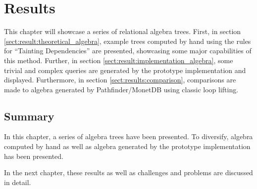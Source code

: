 \chapter{Results}
\label{chapter:results}
This chapter will showcase a series of relational algebra trees. First, in
section \ref{sect:result:theoretical_algebra}, example trees computed by hand
using the rules for ``Tainting Dependencies'' are presented, showcasing
some major capabilities of this method. Further, in section
\ref{sect:result:implementation_algebra}, some trivial and complex queries are
generated by the prototype implementation and displayed. Furthermore, in
section \ref{sect:results:comparison}, comparisons are made to algebra
generated by Pathfinder/MonetDB using classic loop lifting.




\section{Summary}
\label{sect:res:summary}
In this chapter, a series of algebra trees have been presented. To diversify,
algebra computed by hand as well as algebra generated by the prototype
implementation has been presented. 

In the next chapter, these results as well as challenges and problems are
discussed in detail.
